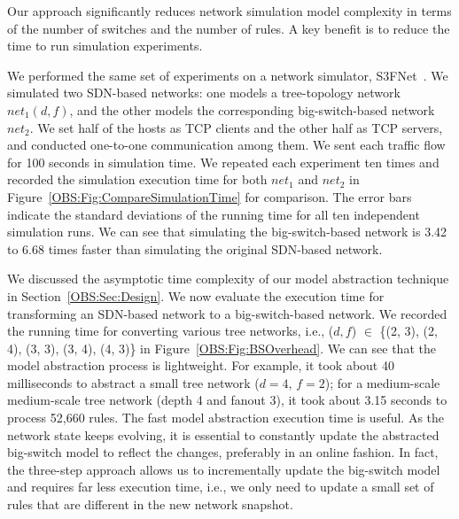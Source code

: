  Our approach significantly reduces network simulation model complexity
in terms of the number of switches and the number of rules.
A key benefit is to reduce the time to run simulation experiments.

We performed the same set of experiments on a network simulator, S3FNet~\cite{S3F}.
We simulated two SDN-based networks: one models a tree-topology network $net_1(d, f)$,
and the other models the corresponding big-switch-based network $net_2$.
We set half of the hosts as TCP clients and the other half as TCP servers,
and conducted one-to-one communication among them.
We sent each traffic flow for 100 seconds in simulation time.
We repeated each experiment ten times and recorded the simulation execution time for both $net_1$ and $net_2$ in
Figure~\ref{OBS:Fig:CompareSimulationTime} for comparison.
The error bars indicate the standard deviations of the running time
for all ten independent simulation runs.
We can see that simulating the big-switch-based network is 3.42 to 6.68 times
faster than simulating the original SDN-based network.


We discussed the asymptotic time complexity of our model abstraction technique in 
Section~\ref{OBS:Sec:Design}.
We now evaluate the execution time for transforming an SDN-based network to a big-switch-based network.
We recorded the running time for converting various tree networks,
i.e., ($d, f$) $\in$ \{(2, 3), (2, 4), (3, 3), (3, 4), (4, 3)\} in Figure~\ref{OBS:Fig:BSOverhead}.
We can see that the model abstraction process is lightweight.
For example, it took about 40 milliseconds to abstract a small tree network ($d=4$, $f=2$);
for a medium-scale medium-scale tree network (depth 4 and fanout 3),
it took about 3.15 seconds to process 52,660 rules.
The fast model abstraction execution time is useful.
As the network state keeps evolving, it is essential to constantly update the abstracted big-switch model to reflect the changes, preferably in an online fashion.
In fact, the three-step approach allows us to incrementally update the big-switch model and requires far less execution time, i.e.,
we only need to update a small set of rules that are different in the new network snapshot.

